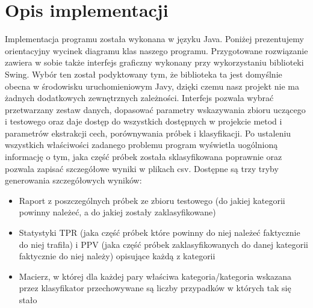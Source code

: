 \documentclass[a4paper]{classrep}
\begin{document}
\section{Opis implementacji}
Implementacja programu została wykonana w języku Java. Poniżej prezentujemy orientacyjny wycinek diagramu klas naszego programu.
Przygotowane rozwiązanie zawiera w sobie także interfejs graficzny wykonany
przy wykorzystaniu biblioteki Swing. Wybór ten został podyktowany tym, że
biblioteka ta jest domyślnie obecna w środowisku uruchomieniowym Javy,
dzięki czemu nasz projekt nie ma żadnych dodatkowych zewnętrznych zależności.
Interfejs pozwala wybrać przetwarzany zestaw danych, dopasować parametry
wskazywania zbioru uczącego i testowego oraz daje dostęp do wszystkich
dostępnych w projekcie metod i parametrów ekstrakcji cech, porównywania próbek
i klasyfikacji. Po ustaleniu wszystkich właściwości zadanego problemu
program wyświetla uogólnioną informację o tym, jaka część próbek została sklasyfikowana
poprawnie oraz pozwala zapisać szczegółowe wyniki w plikach csv. Dostępne są
trzy tryby generowania szczegółowych wyników:
\begin{itemize}
\item Raport z poszczególnych próbek ze zbioru testowego (do jakiej kategorii powinny należeć, a do jakiej zostały zaklasyfikowane)
\item Statystyki TPR (jaka część próbek które powinny do niej należeć faktycznie do niej trafiła) i PPV (jaka część próbek zaklasyfikowanych do danej kategorii faktycznie do niej należy) opisujące każdą z kategorii
\item Macierz, w której dla każdej pary właściwa kategoria/kategoria wskazana przez klasyfikator przechowywane są liczby przypadków w których tak się stało
\end{itemize}
\end{document}
